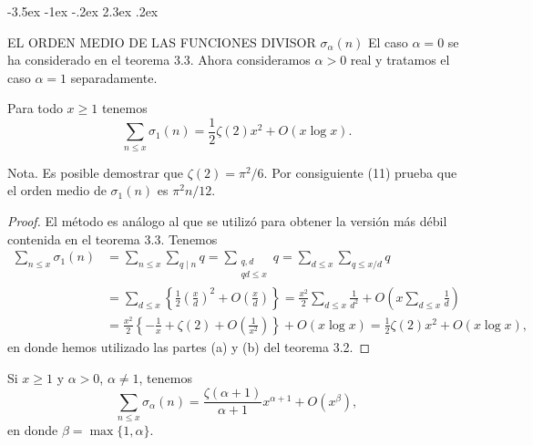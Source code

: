 \documentclass[12pt,a4paper]{book}
\makeatletter
\renewcommand\section{\@startsection{section}{1}{\z@}%
  {-3.5ex \@plus -1ex \@minus -.2ex}%
  {2.3ex \@plus .2ex}%
  {\normalfont\Large\bfseries\raggedright}}
\makeatother
\begin{document}
    \section{EL ORDEN MEDIO DE LAS FUNCIONES DIVISOR \texorpdfstring{$\sigma_{\alpha}(n)$}{σα(n)}}
    El caso $\alpha=0$ se ha considerado en el teorema 3.3. Ahora consideramos $\alpha>0$
    real y tratamos el caso $\alpha=1$ separadamente.

    \begin{teorema}
        Para todo $x\geq1$ tenemos
        \begin{equation}
            \sum_{n\leq x}\sigma_{1}(n)=\frac{1}{2}\zeta(2)x^{2}+O(x\log x).
        \end{equation}
    \end{teorema}

    Nota. Es posible demostrar que $\zeta(2)=\pi^{2}/6$. Por consiguiente (11) prueba que el
    orden medio de $\sigma_{1}(n)$ es $\pi^{2}n/12$.

    \begin{proof}
        El método es análogo al que se utilizó para obtener la versión más débil
        contenida en el teorema 3.3. Tenemos
        \begin{align*}
            \sum_{n\leq x}\sigma_{1}(n)&=\sum_{n\leq x}\sum_{q\mid n}q=\sum_{\substack{q,d\\ qd\leq x}}q
            =\sum_{d\leq x}\sum_{q\leq x/d}q\\
            &=\sum_{d\leq x}\left\{\frac{1}{2}\left(\frac{x}{d}\right)^{2}+O\left(\frac{x}{d}\right)\right\}
            =\frac{x^{2}}{2}\sum_{d\leq x}\frac{1}{d^{2}}+O\left(x\sum_{d\leq x}\frac{1}{d}\right)\\
            &=\frac{x^{2}}{2}\left\{-\frac{1}{x}+\zeta(2)+O\left(\frac{1}{x^{2}}\right)\right\}+O(x\log x)
            =\frac{1}{2}\zeta(2)x^{2}+O(x\log x),
        \end{align*}
        en donde hemos utilizado las partes (a) y (b) del teorema 3.2.
    \end{proof}

    \begin{teorema}
        Si $x\geq1$ y $\alpha>0$, $\alpha\neq1$, tenemos
        \begin{equation*}
            \sum_{n\leq x}\sigma_{\alpha}(n)=\frac{\zeta(\alpha+1)}{\alpha+1}x^{\alpha+1}+O(x^{\beta}),
        \end{equation*}
        en donde $\beta=\max\{1,\alpha\}$.
    \end{teorema}
\end{document}
